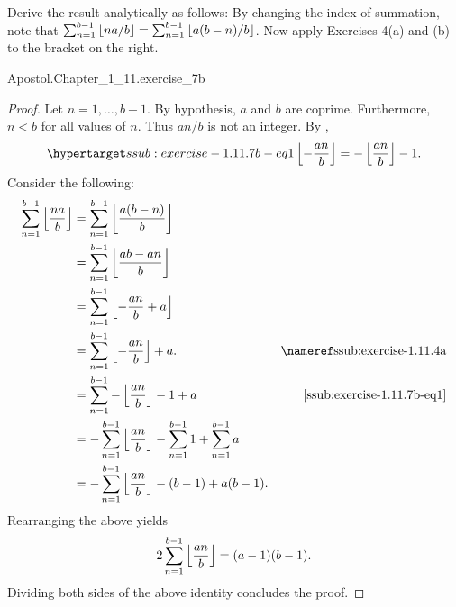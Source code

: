\documentclass{report}
\begin{document}
\subsubsection{}%

  Derive the result analytically as follows:
  By changing the index of summation, note that
    $\sum_{n=1}^{b-1} \left\lfloor na / b\right\rfloor = \sum_{n=1}^{b-1} \left\lfloor a(b - n) / b\right\rfloor$.
  Now apply Exercises 4(a) and (b) to the bracket on the right.

    {Apostol.Chapter\_1\_11.exercise\_7b}

  \begin{proof}
    Let $n = 1, \ldots, b - 1$.
    By hypothesis, $a$ and $b$ are coprime.
    Furthermore, $n < b$ for all values of $n$.
    Thus $an / b$ is not an integer.
    By ,
      \begin{equation}
        \hyperlabel{ssub:exercise-1.11.7b-eq1}
        \floor{-\frac{an}{b}} = -\floor{\frac{an}{b}} - 1.
      \end{equation}
    Consider the following:
      \begin{align*}
        \sum_{n=1}^{b-1} \floor{\frac{na}{b}}
          & = \sum_{n=1}^{b-1} \floor{\frac{a(b - n)}{b}} \\
          & = \sum_{n=1}^{b-1} \floor{\frac{ab - an}{b}} \\
          & = \sum_{n=1}^{b-1} \floor{-\frac{an}{b} + a} \\
          & = \sum_{n=1}^{b-1} \floor{-\frac{an}{b}} + a.
            & \textref{ssub:exercise-1.11.4a} \\
          & = \sum_{n=1}^{b-1} -\floor{\frac{an}{b}} - 1 + a
            & \eqref{ssub:exercise-1.11.7b-eq1} \\
          & = -\sum_{n=1}^{b-1} \floor{\frac{an}{b}} - \sum_{n=1}^{b-1} 1 +
            \sum_{n=1}^{b-1} a \\
          & = -\sum_{n=1}^{b-1} \floor{\frac{an}{b}} - (b - 1) + a(b - 1).
      \end{align*}
    Rearranging the above yields
      $$2\sum_{n=1}^{b-1} \left\lfloor\frac{an}{b}\right\rfloor = (a - 1)(b - 1).$$
    Dividing both sides of the above identity concludes the proof.
  \end{proof}

\subsection{}%
\end{document}
